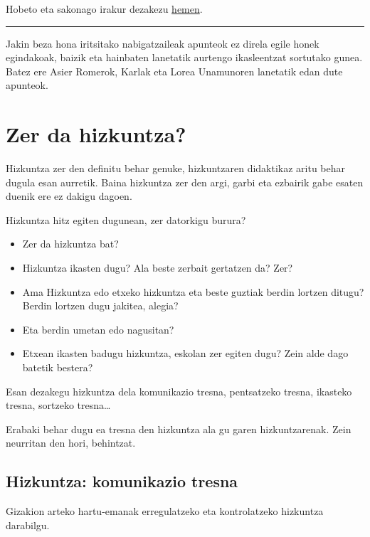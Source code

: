 \documentclass[
]{book}
\providecommand{\tightlist}{%
  \setlength{\itemsep}{0pt}\setlength{\parskip}{0pt}}
\begin{document}
Hobeto eta sakonago irakur dezakezu \href{../Baliabideak/00_aurkezpena/Syllabus_HDHH22-V0.pdf}{hemen}.

\begin{center}\rule{0.5\linewidth}{0.5pt}\end{center}

Jakin beza hona iritsitako nabigatzaileak apunteok ez direla egile honek egindakoak, baizik eta hainbaten lanetatik aurtengo ikasleentzat sortutako gunea.
Batez ere Asier Romerok, Karlak eta Lorea Unamunoren lanetatik edan dute apunteok.

\hypertarget{T1}{%
\chapter{Zer da hizkuntza?}\label{T1}}

Hizkuntza zer den definitu behar genuke, hizkuntzaren didaktikaz aritu behar dugula esan aurretik. Baina hizkuntza zer den argi, garbi eta ezbairik gabe esaten duenik ere ez dakigu dagoen.

Hizkuntza hitz egiten dugunean, zer datorkigu burura?

\begin{itemize}
\tightlist
\item
  Zer da hizkuntza bat?
\item
  Hizkuntza ikasten dugu? Ala beste zerbait gertatzen da? Zer?
\item
  Ama Hizkuntza edo etxeko hizkuntza eta beste guztiak berdin lortzen ditugu? Berdin lortzen dugu jakitea, alegia?
\item
  Eta berdin umetan edo nagusitan?
\item
  Etxean ikasten badugu hizkuntza, eskolan zer egiten dugu? Zein alde dago batetik bestera?
\end{itemize}

Esan dezakegu hizkuntza dela komunikazio tresna, pentsatzeko tresna, ikasteko tresna, sortzeko tresna\ldots{}

Erabaki behar dugu ea tresna den hizkuntza ala gu garen hizkuntzarenak. Zein neurritan den hori, behintzat.

\hypertarget{hizkuntza-komunikazio-tresna}{%
\section{Hizkuntza: komunikazio tresna}\label{hizkuntza-komunikazio-tresna}}

Gizakion arteko hartu-emanak erregulatzeko eta kontrolatzeko hizkuntza darabilgu.
\end{document}
